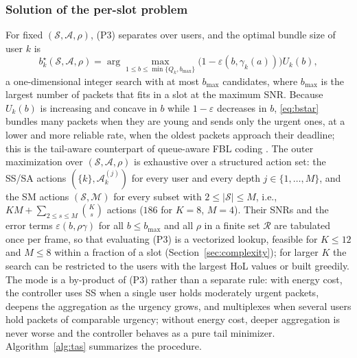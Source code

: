 \documentclass[journal]{IEEEtran}
\newcommand{\Sset}{\mathcal{S}}
\newcommand{\Mset}{\mathcal{M}}
\begin{document}
\subsubsection{Solution of the per-slot problem}
For fixed $(\Sset,\mathcal A,\rho)$, (P3) separates over users, and the optimal bundle size of user $k$ is
\begin{equation}\label{eq:bstar}
b_k^\star(\Sset,\mathcal A,\rho)=\arg\max_{1\le b\le\min\{Q_k,b_{\max}\}}\big(1-\varepsilon(b,\gamma_k(a))\big)U_k(b),
\end{equation}
a one-dimensional integer search with at most $b_{\max}$ candidates, where $b_{\max}$ is the largest number of packets that fits in a slot at the maximum SNR. Because $U_k(b)$ is increasing and concave in $b$ while $1-\varepsilon$ decreases in $b$, \eqref{eq:bstar} bundles many packets when they are young and sends only the urgent ones, at a lower and more reliable rate, when the oldest packets approach their deadline; this is the tail-aware counterpart of queue-aware FBL coding \cite{Zhao2022QueueAware}. The outer maximization over $(\Sset,\mathcal A,\rho)$ is exhaustive over a structured action set: the SS/SA actions $(\{k\},\mathcal A_k^{(j)})$ for every user and every depth $j\in\{1,\dots,M\}$, and the SM actions $(\Sset,\Mset)$ for every subset with $2\le|\Sset|\le M$, i.e., $KM+\sum_{2\le s\le M}\binom{K}{s}$ actions ($186$ for $K=8$, $M=4$). Their SNRs and the error terms $\varepsilon(b,\rho\gamma)$ for all $b\le b_{\max}$ and all $\rho$ in a finite set $\mathcal R$ are tabulated once per frame, so that evaluating (P3) is a vectorized lookup, feasible for $K\le 12$ and $M\le 8$ within a fraction of a slot (Section~\ref{sec:complexity}); for larger $K$ the search can be restricted to the users with the largest HoL values or built greedily. The mode is a by-product of (P3) rather than a separate rule: with energy cost, the controller uses SS when a single user holds moderately urgent packets, deepens the aggregation as the urgency grows, and multiplexes when several users hold packets of comparable urgency; without energy cost, deeper aggregation is never worse and the controller behaves as a pure tail minimizer. Algorithm~\ref{alg:tas} summarizes the procedure.
\end{document}
